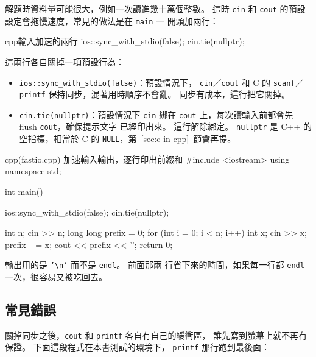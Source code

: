 解題時資料量可能很大，例如一次讀進幾十萬個整數。 這時 \texttt{cin}
和 \texttt{cout} 的預設設定會拖慢速度，常見的做法是在 \texttt{main} 一
開頭加兩行：

\begin{code}{cpp}{輸入加速的兩行}
ios::sync_with_stdio(false);
cin.tie(nullptr);
\end{code}

這兩行各自關掉一項預設行為：

\begin{itemize}
\item \texttt{ios::sync\_with\_stdio(false)}：預設情況下，
\texttt{cin}／\texttt{cout} 和 C 的 \texttt{scanf}／\texttt{printf}
保持同步，混著用時順序不會亂。 同步有成本，這行把它關掉。
\item \texttt{cin.tie(nullptr)}：預設情況下 \texttt{cin} 綁在
\texttt{cout} 上，每次讀輸入前都會先 flush \texttt{cout}，確保提示文字
已經印出來。 這行解除綁定。 \texttt{nullptr} 是 C++ 的空指標，相當於
C 的 \texttt{NULL}，第~\ref{sec:c-in-cpp}~節會再提。
\end{itemize}

\begin{example}[label=ex:fastio]{cpp}{(fastio.cpp) 加速輸入輸出，逐行印出前綴和}
#include <iostream>
using namespace std;

int main() {
    ios::sync_with_stdio(false);
    cin.tie(nullptr);

    int n;
    cin >> n;
    long long prefix = 0;
    for (int i = 0; i < n; i++) {
        int x;
        cin >> x;
        prefix += x;
        cout << prefix << '\n';
    }
    return 0;
}
\end{example}


輸出用的是 \texttt{'\textbackslash n'} 而不是 \texttt{endl}。 前面那兩
行省下來的時間，如果每一行都 \texttt{endl} 一次，很容易又被吃回去。

\subsection{常見錯誤}

關掉同步之後，\texttt{cout} 和 \texttt{printf} 各自有自己的緩衝區，
誰先寫到螢幕上就不再有保證。 下面這段程式在本書測試的環境下，
\texttt{printf} 那行跑到最後面：

